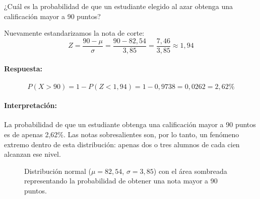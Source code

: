 ¿Cuál es la probabilidad de que un estudiante elegido al azar obtenga una calificación mayor a
90 puntos?

Nuevamente estandarizamos la nota de corte:
\begin{equation*}
  Z = \frac{90 - \mu}{\sigma} = \frac{90 - 82{,}54}{3{,}85} = \frac{7{,}46}{3{,}85} \approx 1{,}94
\end{equation*}

\paragraph{Respuesta:}
\[ P(X > 90) = 1 - P(Z < 1{,}94) = 1 - 0{,}9738 = 0{,}0262 = 2{,}62\% \]

\paragraph{Interpretación:} La probabilidad de que un estudiante obtenga una calificación mayor a
90 puntos es de apenas 2,62\%. Las notas sobresalientes son, por lo tanto, un fenómeno extremo
dentro de esta distribución: apenas dos o tres alumnos de cada cien alcanzan ese nivel.

\begin{figure}[H]
    \centering
    \caption{Distribución normal (\(\mu = 82{,}54\), \(\sigma = 3{,}85\)) con el área sombreada
    representando la probabilidad de obtener una nota mayor a 90 puntos.}
    \label{fig:normal_mayor_90}
\end{figure}

